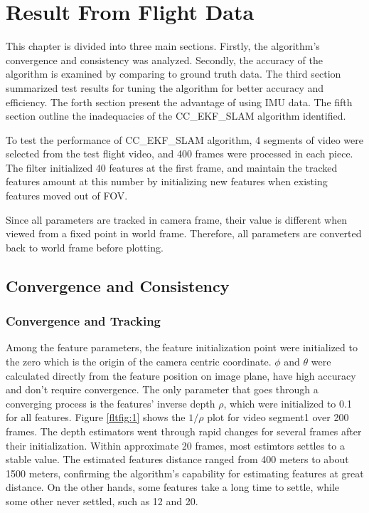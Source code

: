 \chapter{Result From Flight Data}\label{ch:FlightResult}

This chapter is divided into three main sections. Firstly, the
algorithm's convergence and consistency was analyzed. Secondly, the
accuracy of the algorithm is examined by comparing to ground truth
data. The third section summarized test results for tuning the
algorithm for better accuracy and efficiency. The forth section
present the advantage of using IMU data. The fifth section outline
the inadequacies of the CC\_EKF\_SLAM algorithm identified.

To test the performance of CC\_EKF\_SLAM algorithm, 4 segments of video
were selected from the test flight video, and 400 frames were
processed in each piece. The filter initialized 40 features at the
first frame, and maintain the tracked features amount at this number
by initializing new features when existing features moved out of FOV.

Since all parameters are tracked in camera frame, their value is 
different when viewed from a fixed point in world frame. Therefore, all 
parameters are converted back to world frame before plotting. 

\section{Convergence and Consistency}

\subsection{Convergence and Tracking}
Among the feature parameters, the feature initialization point were
initialized to the zero which is the origin of the camera centric
coordinate. $\phi$ and $\theta$ were calculated directly from the
feature position on image plane, have high accuracy and don't require
convergence. The only parameter that goes through a converging process
is the features' inverse depth $\rho$, which were initialized to 0.1
for all features. Figure \ref{fltfig:1} shows the $1/\rho$ plot for
video segment1 over 200 frames. The depth estimators went through
rapid changes for several frames after their initialization. Within
approximate 20 frames, most estimtors settles to a stable value. The
estimated features distance ranged from 400 meters to about 1500
meters, confirming the algorithm's capability for estimating features
at great distance. On the other hands, some features take a long time
to settle, while some other never settled, such as 12 and 20.

